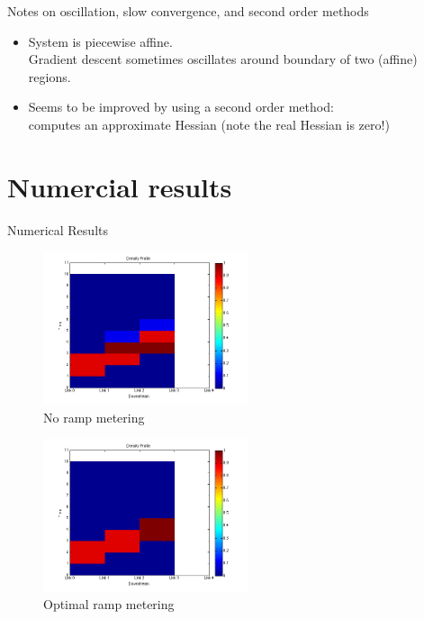 \documentclass[xcolor=svgnames, english, smaller]{beamer}
\theoremstyle{plain}
\theoremstyle{definition}
\theoremstyle{plain}
\theoremstyle{plain}
\begin{document}
\begin{frame}{Notes on oscillation, slow convergence, and second order methods}

\begin{itemize}
\item System is piecewise affine.\\
Gradient descent sometimes oscillates around boundary of two (affine) regions.
\item Seems to be improved by using a second order method: \\
computes an approximate Hessian (note the real Hessian is zero!)
\end{itemize}

\end{frame}


\section{Numercial results}
\begin{frame}{Numerical Results}

\pause
\begin{minipage}[t]{0.48\linewidth}
\begin{figure}[h]
\includegraphics[width=60mm]{before.png}
\caption{No ramp metering}
\end{figure}
\end{minipage}\hfill
\begin{minipage}[t]{0.48\linewidth}
\begin{figure}[h]
\includegraphics[width=60mm]{after.png}
\caption{Optimal ramp metering}
\end{figure}
\end{minipage}

\end{frame}
\end{document}

